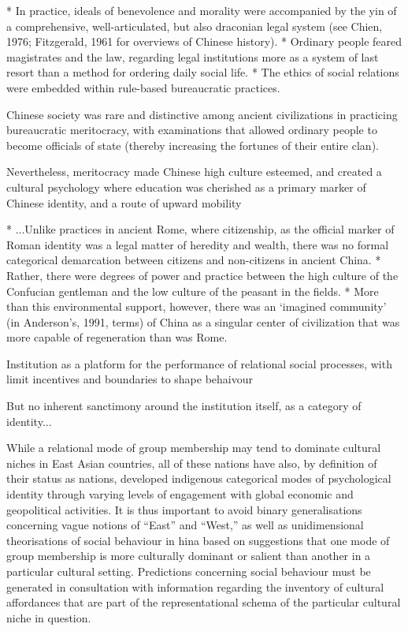 {* In practice, ideals of benevolence and morality were accompanied by the yin of a comprehensive, well-articulated, but also draconian legal system (see Chien, 1976; Fitzgerald, 1961 for overviews of Chinese history).
* Ordinary people feared magistrates and the law, regarding legal institutions more as a system of last resort than a method for ordering daily social life.
* The ethics of social relations were embedded within rule-based bureaucratic practices.

Chinese society was rare and distinctive among ancient civilizations in practicing bureaucratic meritocracy, with examinations that allowed ordinary people to become officials of state (thereby increasing the fortunes of their entire clan).

Nevertheless, meritocracy made Chinese high culture esteemed, and created a cultural psychology where education was cherished as a primary marker of Chinese identity, and a route of upward mobility


* ...Unlike practices in ancient Rome, where citizenship, as the official marker of Roman identity was a legal matter of heredity and wealth, there was no formal categorical demarcation between citizens and non-citizens in ancient China.
* Rather, there were degrees of power and practice between the high culture of the Confucian gentleman and the low culture of the peasant in the fields.
* More than this environmental support, however, there was an ‘imagined community’ (in Anderson’s, 1991, terms) of China as a singular center of civilization that was more capable of regeneration than was Rome.

Institution as a platform for the performance of relational social processes, with limit incentives and boundaries to shape behaivour

But no inherent sanctimony around the institution itself, as a category of identity...



While a relational mode of group membership may tend to dominate cultural niches in East Asian countries, all of these nations have also, by definition of their status as nations, developed indigenous categorical modes of psychological identity through varying levels of engagement with global economic and geopolitical activities. It is thus important to avoid binary generalisations concerning vague notions of ``East'' and ``West,'' as well as unidimensional theorisations of social behaviour in hina based on suggestions that one mode of group membership is more culturally dominant or salient than another in a particular cultural setting.  Predictions concerning social behaviour must be generated in consultation with information regarding the inventory of cultural affordances that are part of the representational schema of the particular cultural niche in question.


}

